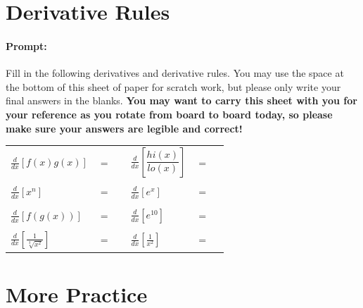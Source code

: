 \documentclass[10pt]{article}
\begin{document}
\pagestyle{otherpages}
\thispagestyle{firstpage}

\section{Derivative Rules}
{
\paragraph*{Prompt:} Fill in the following derivatives and derivative rules. You may use the space at the bottom of this sheet of paper for scratch work, but please only write your final answers in the blanks. {\bf You may want to carry this sheet with you for your reference as you rotate from board to board today, so please make sure your answers are legible and correct!}\\[0.1in]

\begin{tabular}{l c r l c r}
            $\displaystyle\frac{d}{dx}\left[ f(x)g(x) \right]$ & $=$ & \rule[-8pt]{2in}{0.4pt} &
            $\displaystyle\frac{d}{dx}\left[ \dfrac{hi(x)}{lo(x)} \right]$ & $=$ & \rule[-8pt]{2in}{0.4pt}\\[0.3in]
            $\displaystyle\frac{d}{dx}\left[ x^n \right]$ & $=$ & \rule[-8pt]{2in}{0.4pt} & 
            $\displaystyle\frac{d}{dx}\left[ e^x \right]$ & $=$ & \rule[-8pt]{2in}{0.4pt}\\[0.3in]
            $\displaystyle\frac{d}{dx}\left[ f(g(x)) \right]$ & $=$ & \rule[-8pt]{2in}{0.4pt} & 
            $\displaystyle\frac{d}{dx}\left[ e^{10} \right]$ & $=$ & \rule[-8pt]{2in}{0.4pt}\\[0.3in]
            $\displaystyle\frac{d}{dx}\left[ \frac{1}{\sqrt[3]{x^2}} \right]$ & $=$ & \rule[-8pt]{2in}{0.4pt} & 
            $\displaystyle\frac{d}{dx}\left[ \frac{1}{x^2} \right]$ & $=$ & \rule[-8pt]{2in}{0.4pt}\\[0.3in]
        \end{tabular}

\newpage%


\section{More Practice}
{\large

}}
\end{document}
